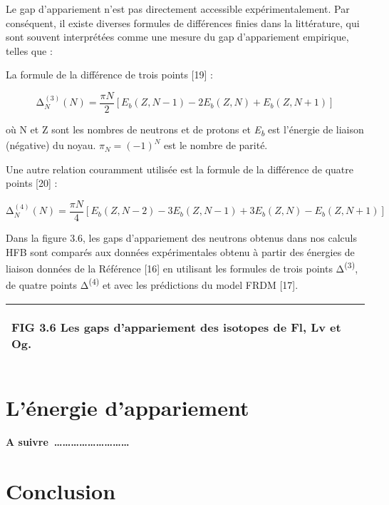  Le gap d’appariement n’est pas directement accessible expérimentalement. Par conséquent, il existe diverses formules de différences finies dans la littérature, qui sont souvent interprétées comme une mesure du gap d’appariement empirique, telles que :

La formule de la différence de trois points [19] :

\begin{equation}∆_N^{\left(3\right)}\left(N\right)=\frac{\mathit{πN}} 2[E_b\left(Z,N-1\right)-2E_b\left(Z,N\right)+E_b\left(Z,N+1\right)]\end{equation} 

où N et Z sont les nombres de neutrons et de protons et \textit{E}\textit{\textsubscript{b}} est l’énergie de liaison (négative) du noyau.  $π_N=(-1)^N$  est le nombre de parité.

 Une autre relation couramment utilisée est la formule de la différence de quatre points [20] :

 \begin{equation}∆_N^{\left(4\right)}\left(N\right)=\frac{\mathit{πN}} 4[E_b\left(Z,N-2\right)-3E_b\left(Z,N-1\right)+3E_b\left(Z,N\right)-E_b\left(Z,N+1\right)]\end{equation} 

 Dans la figure 3.6, les gaps d’appariement des neutrons obtenus dans nos calculs HFB sont comparés aux données expérimentales obtenu à partir des énergies de liaison données de la Référence [16] en utilisant les formules de trois points Δ\textsuperscript{(3)}, de quatre points Δ\textsuperscript{(4)} et avec les prédictions du model FRDM [17]. 

\begin{flushleft}
\tablefirsthead{}
\tablehead{}
\tabletail{}
\tablelasttail{}
\begin{supertabular}{|m{6.4018598in}|}
\hline
{\begin{french}  FIG 3.6 Les gaps d’appariement des isotopes de Fl, Lv et Og.\end{french}}\\\hline
\end{supertabular}
\end{flushleft}

\section{L’énergie d’appariement}

\textbf{ A suivre~………………………}

\section{Conclusion}

